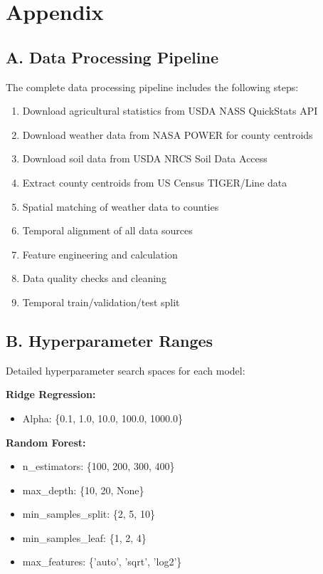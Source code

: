 \documentclass[conference]{IEEEtran}
\begin{document}
\section*{Appendix}

\subsection*{A. Data Processing Pipeline}

The complete data processing pipeline includes the following steps:
\begin{enumerate}
    \item Download agricultural statistics from USDA NASS QuickStats API
    \item Download weather data from NASA POWER for county centroids
    \item Download soil data from USDA NRCS Soil Data Access
    \item Extract county centroids from US Census TIGER/Line data
    \item Spatial matching of weather data to counties
    \item Temporal alignment of all data sources
    \item Feature engineering and calculation
    \item Data quality checks and cleaning
    \item Temporal train/validation/test split
\end{enumerate}

\subsection*{B. Hyperparameter Ranges}

Detailed hyperparameter search spaces for each model:

\textbf{Ridge Regression:}
\begin{itemize}
    \item Alpha: \{0.1, 1.0, 10.0, 100.0, 1000.0\}
\end{itemize}

\textbf{Random Forest:}
\begin{itemize}
    \item n\_estimators: \{100, 200, 300, 400\}
    \item max\_depth: \{10, 20, None\}
    \item min\_samples\_split: \{2, 5, 10\}
    \item min\_samples\_leaf: \{1, 2, 4\}
    \item max\_features: \{'auto', 'sqrt', 'log2'\}
\end{itemize}
\end{document}
